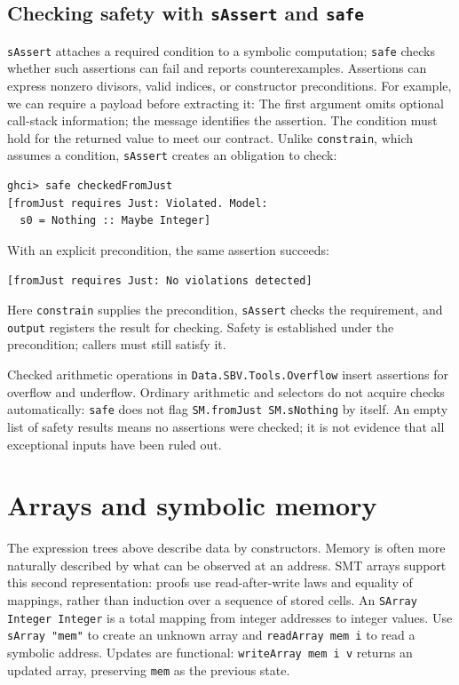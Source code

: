 \documentclass[review]{jfp-epi}
\newcommand{\code}[1]{\texttt{#1}}
\begin{document}
\subsection{Checking safety with \texttt{sAssert} and \texttt{safe}}
\label{sec:safety-checks}

\code{sAssert} attaches a required condition to a symbolic computation;
\code{safe} checks whether such assertions can fail and reports counterexamples.
Assertions can express nonzero divisors, valid indices, or constructor
preconditions. For example, we can require a payload before extracting it:
The first argument omits optional call-stack information; the message identifies
the assertion. The condition must hold for the returned value to meet our
contract. Unlike \code{constrain}, which assumes a condition, \code{sAssert}
creates an obligation to check:
\begin{lstlisting}[style=output]
ghci> safe checkedFromJust
[fromJust requires Just: Violated. Model:
  s0 = Nothing :: Maybe Integer]
\end{lstlisting}
With an explicit precondition, the same assertion succeeds:
\begin{lstlisting}[style=output]
[fromJust requires Just: No violations detected]
\end{lstlisting}
Here \code{constrain} supplies the precondition, \code{sAssert} checks the
requirement, and \code{output} registers the result for checking. Safety is
established under the precondition; callers must still satisfy it.

Checked arithmetic operations in \code{Data.SBV.Tools.Overflow} insert assertions
for overflow and underflow. Ordinary arithmetic and selectors do not acquire
checks automatically: \code{safe} does not flag \code{SM.fromJust SM.sNothing}
by itself. An empty list of safety results means no assertions were checked;
it is not evidence that all exceptional inputs have been ruled out.


\section{Arrays and symbolic memory}
\label{sec:arrays}

The expression trees above describe data by constructors. Memory is often more
naturally described by what can be observed at an address. SMT arrays support
this second representation: proofs use read-after-write laws and equality of
mappings, rather than induction over a sequence of stored cells.
An \code{SArray Integer Integer} is a total mapping from integer addresses to
integer values. Use \code{sArray "mem"} to create an unknown array and
\code{readArray mem i} to read a symbolic address. Updates are functional:
\code{writeArray mem i v} returns an updated array, preserving \code{mem} as
the previous state.
\end{document}
